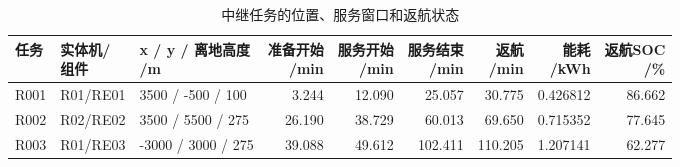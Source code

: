 \begin{table}[!htbp]
\centering
\footnotesize
\setlength{\tabcolsep}{3pt}
\renewcommand{\arraystretch}{1.10}
\caption{中继任务的位置、服务窗口和返航状态}\label{tab:q3-relays}
\begin{tabular}{@{}lllrrrrrr@{}}
\toprule
任务 & \shortstack{实体机/\\组件} & \shortstack{x / y / 离地高度\\/m} & \shortstack{准备开始\\/min} & \shortstack{服务开始\\/min} & \shortstack{服务结束\\/min} & \shortstack{返航\\/min} & \shortstack{能耗\\/kWh} & \shortstack{返航SOC\\/\%} \\
\midrule
R001 & R01/RE01 & 3500 / -500 / 100 & 3.244 & 12.090 & 25.057 & 30.775 & 0.426812 & 86.662 \\
R002 & R02/RE02 & 3500 / 5500 / 275 & 26.190 & 38.729 & 60.013 & 69.650 & 0.715352 & 77.645 \\
R003 & R01/RE03 & -3000 / 3000 / 275 & 39.088 & 49.612 & 102.411 & 110.205 & 1.207141 & 62.277 \\
\bottomrule
\end{tabular}
\end{table}
